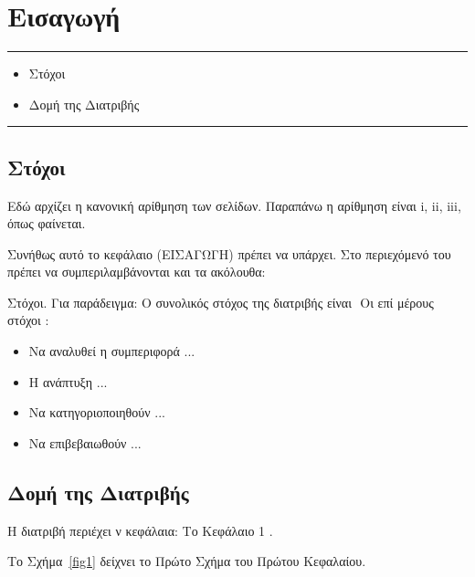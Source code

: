 \chapter{Εισαγωγή}
\label{ch:intro}
\hrule\vspace{0.2in}
\begin{itemize}
  \item[\ref{sec:11}] Στόχοι
  \item[\ref{sec:12}] Δομή της Διατριβής
\end{itemize}
\hrule \vspace{0.2in}



\section{Στόχοι}\label{sec:11}
Εδώ αρχίζει η κανονική αρίθμηση των σελίδων. Παραπάνω η αρίθμηση
είναι i, ii, iii,  όπως φαίνεται.

Συνήθως αυτό το κεφάλαιο (ΕΙΣΑΓΩΓΗ) πρέπει να υπάρχει. Στο
περιεχόμενό του πρέπει να συμπεριλαμβάνονται και τα ακόλουθα:

\y Στόχοι. Για παράδειγμα: Ο συνολικός στόχος της διατριβής είναι
 Οι επί μέρους στόχοι :
\begin{itemize}
\item Να αναλυθεί η συμπεριφορά ...
\item Η ανάπτυξη  ...
\item Να κατηγοριοποιηθούν  ...
\item Να επιβεβαιωθούν  ...
\end{itemize}




\section{Δομή της Διατριβής}\label{sec:12}
Η διατριβή περιέχει ν κεφάλαια: Το Κεφάλαιο 1 .


\newpage
Το Σχήμα~\ref{fig1} δείχνει το Πρώτο Σχήμα του Πρώτου Κεφαλαίου.

